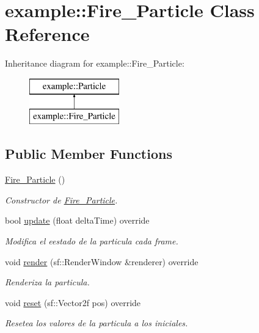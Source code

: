 \hypertarget{classexample_1_1_fire___particle}{}\section{example\+::Fire\+\_\+\+Particle Class Reference}
\label{classexample_1_1_fire___particle}
Inheritance diagram for example\+::Fire\+\_\+\+Particle\+:\begin{figure}[H]
\begin{center}
\leavevmode
\includegraphics[height=2.000000cm]{classexample_1_1_fire___particle}
\end{center}
\end{figure}
\subsection*{Public Member Functions}
\begin{DoxyCompactItemize}
\item 
\mbox{\hyperlink{classexample_1_1_fire___particle_a17b04781f4003239ead55e1999fcbe40}{Fire\+\_\+\+Particle}} ()
\begin{DoxyCompactList}\small\item\em Constructor de \mbox{\hyperlink{classexample_1_1_fire___particle}{Fire\+\_\+\+Particle}}. \end{DoxyCompactList}\item 
bool \mbox{\hyperlink{classexample_1_1_fire___particle_a92201a3db8fe147e61b0255ab2b99097}{update}} (float delta\+Time) override
\begin{DoxyCompactList}\small\item\em Modifica el eestado de la particula cada frame. \end{DoxyCompactList}\item 
void \mbox{\hyperlink{classexample_1_1_fire___particle_a75c0920290826c96f3f94c3e5ef3c7c5}{render}} (sf\+::\+Render\+Window \&renderer) override
\begin{DoxyCompactList}\small\item\em Renderiza la particula. \end{DoxyCompactList}\item 
void \mbox{\hyperlink{classexample_1_1_fire___particle_aa8ac501ef8b43969d47bca8236ab7f73}{reset}} (sf\+::\+Vector2f pos) override
\begin{DoxyCompactList}\small\item\em Resetea los valores de la particula a los iniciales. \end{DoxyCompactList}\end{DoxyCompactItemize}
